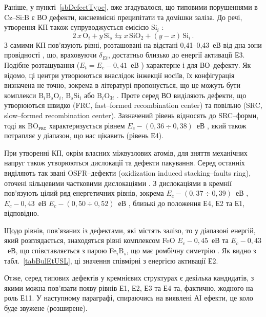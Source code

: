 Раніше, у пункті~\ref{sbDefectType}, вже згадувалося, що
типовими порушеннями в Cz--Si:B є ВО дефекти, кисневмісні преципітати та домішки заліза.
До речі, утворення КП також супруводжується емісією Si$_i$ \cite{MSER13}:
\begin{equation*}\label{eqSiO}
  2\,x\,\mbox{O}_i+y\,\mbox{Si}_s\leftrightarrows x\,\mbox{SiO}_2+(y-x)\,\mbox{Si}_i\,.
\end{equation*}
З самими КП пов'язують рівні, розташовані на відстані 0,41--0,43~еВ від дна зони провідності \cite{SiO:Mchedlidze,SiO:Vanhell,SiO:Chan}, що, враховуючи  $\delta_{Et}$, достатньо близько до енергії активації Е3.
Подібне розташування ($E_t=E_c-0,41$~еВ \cite{LIDRev,LIDRev2,BO3i,Rein,LID:SchmidtJMR}) характерне і для ВО--дефекту.
Як відомо, ці центри утворюються внаслідок інжекції носіїв,
їх конфігурація визначена не точно, зокрема в літературі пропонується,
що це можуть бути комплекси B$_i$B$_s$O$_i$, B$_s$Si$_i$\cite{LIDRev} або
B$_i$O$_{3i}$ \cite{BO3i}.
Проте серед ВО виділяють дефекти,
що утворюються швидко (FRC, fast--formed recombination center)
та повільно (SRC, slow--formed recombination center).
Зазначений рівень відносять до SRC--форми,
тоді як  BO$_\mathtt{FRC}$ характеризується рівнем $E_c-(0,36\div0,38)$~еВ \cite{LIDRev2,BOSingle:SEMSS2017}, який
також потрапляє у діапазон, що нас цікавить (рівень Е4).

При утворенні КП, окрім власних міжвузлових атомів, для зняття механічних напруг також утворюються дислокації та дефекти пакування.
Серед останніх виділяють так звані OSFR--дефекти (oxidization induced stacking--faults ring), оточені кільцевими частковими дислокаціями \cite{MSER74,MSER28}.
З дислокаціями в кремнії пов'язують цілий ряд енергетичних рівнів, зокрема
$E_c-(0,37\div0,39)$~еВ \cite{PhysRevB56:10208,kveder2008,SiO:Hwang,disl10:Isakova,Kittler2003},
$E_c-0,43$~еВ \cite{PhysRevB56:10208,SiO:Vanhell}
$E_c-(0,50\div0,52)$~еВ \cite{Edis:Ogawa,Edis:Omling,Kittler2003},
близькі до положення Е4, Е2 та Е1, відповідно.

Щодо рівнів, пов'язаних із дефектами, які містять залізо, то у діапазоні енергій, який розглядається,
знаходяться рівні комплексом FeO $E_c-0,45$~еВ\cite{FeO}
та $E_c-0,43$~еВ, що співставляється з парою Fe$_i$B$_s$, що має ромбічну симетрію \cite{FeB:PhysRevB49,Istratov1999}.
Як видно з табл.~\ref{tabBulEtUSL}, ці значення співмірні з енергією активації Е2.

Отже, серед типових дефектів у кремнієвих структурах є декілька кандидатів,
з якими можна пов'язати появу рівнів Е1, Е2, Е3 та Е4 та, фактично, жодного на роль Е11.
У наступному параграфі, спираючись на виявлені АІ ефекти, це коло буде звужене (розширене).

